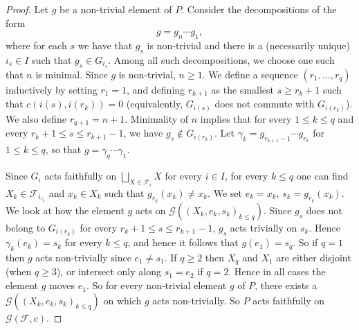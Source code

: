 \documentclass[11pt]{amsart}
\newcommand{\F}{\ensuremath{\mathcal{F}}}%
\theoremstyle{definition}
\theoremstyle{plain}
\theoremstyle{remark}
\begin{document}
\begin{proof}
	Let $g$ be a non-trivial element of $P$. Consider the decompositions of the form \[ g = g_n \cdots g_{1},  \] where for each $s$ we have that $g_{s}$ is non-trivial and there is a (necessarily unique) $i_s \in I$ such that $g_{s} \in G_{i_s}$. Among all such decompositions, we choose one such that $n$ is minimal. Since $g$ is non-trivial, $n \geq 1$. We define a sequence $(r_1,\ldots,r_q)$ inductively by setting $r_1 = 1$, and defining $r_{k+1}$ as the smallest $s \geq r_k +1$ such that $c(i(s),i(r_k)) = 0$ (equivalently, $G_{i(s)}$ does not commute with $G_{i(r_k)}$). We also define $r_{q+1} = n+1$. Minimality of $n$ implies that for every $1 \leq k \leq q$ and every $r_k + 1 \leq s \leq r_{k+1}-1$, we have $g_s \notin G_{i(r_k)}$. Let $\gamma_k = g_{r_{k+1}-1} \cdots g_{r_k}$ for $1 \leq k \leq q$, so that $g = \gamma_q \cdots \gamma_1$.  
	
	Since $G_i$ acts faithfully on $\bigsqcup_{X \in \F_i} X$ for every $i \in I$, for every $k \leq q$ one can find $X_k \in \F_{i_{r_k}}$ and  $x_k \in X_{k}$ such that $g_{r_k}(x_k) \neq x_k$. We set $e_{k} = x_k$, $s_{k} = g_{r_k}(x_k)$. We look at how the element $g$ acts on $\mathcal{G}((X_k,e_k,s_k)_{k \leq q})$. Since $g_s$ does not belong to  $G_{i(r_k)}$ for every $r_k + 1 \leq s \leq r_{k+1}-1$, $g_s$ acts trivially on $s_k$. Hence $\gamma_k(e_k) = s_k$ for every $k \leq q$, and hence it follows that $g(e_1) = s_q$. So if $q=1$ then $g$ acts non-trivially since $e_1 \neq s_1$. If $q \geq 2$ then $X_q$ and $X_1$ are either disjoint (when $q \geq 3$), or intersect only along $s_1 = e_2$ if $q=2$. Hence in all cases the element $g$ moves $e_1$. So for every non-trivial element $g$ of $P$, there exists a $\mathcal{G}((X_k,e_k,s_k)_{k \leq q})$ on which $g$ acts non-trivially. So $P$ acts faithfully on $\mathcal{G}(\F,c)$.
\end{proof}


\end{document}
